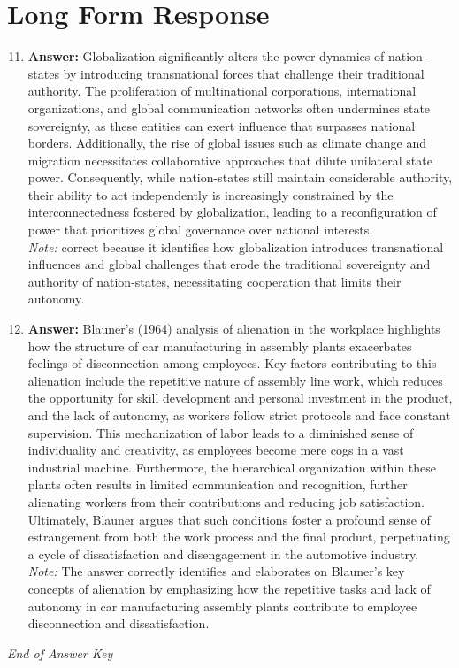 \documentclass[12pt]{article}
\begin{document}
\section*{Long Form Response}
\begin{enumerate}[label=\arabic*.]
\setcounter{enumi}{10}
\item \textbf{Answer:} Globalization significantly alters the power dynamics of nation-states by introducing transnational forces that challenge their traditional authority. The proliferation of multinational corporations, international organizations, and global communication networks often undermines state sovereignty, as these entities can exert influence that surpasses national borders. Additionally, the rise of global issues such as climate change and migration necessitates collaborative approaches that dilute unilateral state power. Consequently, while nation-states still maintain considerable authority, their ability to act independently is increasingly constrained by the interconnectedness fostered by globalization, leading to a reconfiguration of power that prioritizes global governance over national interests.
\\ \textit{Note:} correct because it identifies how globalization introduces transnational influences and global challenges that erode the traditional sovereignty and authority of nation-states, necessitating cooperation that limits their autonomy.
\item \textbf{Answer:} Blauner's (1964) analysis of alienation in the workplace highlights how the structure of car manufacturing in assembly plants exacerbates feelings of disconnection among employees. Key factors contributing to this alienation include the repetitive nature of assembly line work, which reduces the opportunity for skill development and personal investment in the product, and the lack of autonomy, as workers follow strict protocols and face constant supervision. This mechanization of labor leads to a diminished sense of individuality and creativity, as employees become mere cogs in a vast industrial machine. Furthermore, the hierarchical organization within these plants often results in limited communication and recognition, further alienating workers from their contributions and reducing job satisfaction. Ultimately, Blauner argues that such conditions foster a profound sense of estrangement from both the work process and the final product, perpetuating a cycle of dissatisfaction and disengagement in the automotive industry.
\\ \textit{Note:} The answer correctly identifies and elaborates on Blauner's key concepts of alienation by emphasizing how the repetitive tasks and lack of autonomy in car manufacturing assembly plants contribute to employee disconnection and dissatisfaction.
\end{enumerate}

\vfill
\noindent\textit{End of Answer Key}
\end{document}
